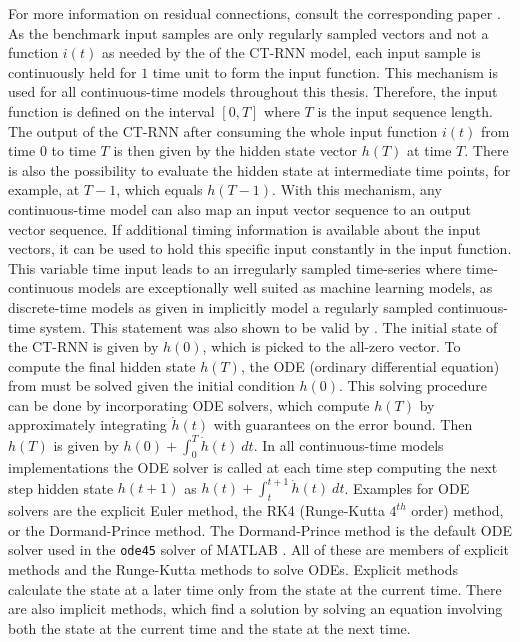 \documentclass[draft,final]{vutinfth} %
\begin{document}
    For more information on residual connections, consult the corresponding paper \cite{ResNet}.
    As the benchmark input samples are only regularly sampled vectors and not a function $i(t)$ as needed by the  of the CT-RNN model, each input sample is continuously held for $1$ time unit to form the input function.
    This mechanism is used for all continuous-time models throughout this thesis.
    Therefore, the input function is defined on the interval $[0, T]$ where $T$ is the input sequence length.
    The output of the CT-RNN after consuming the whole input function $i(t)$ from time $0$ to time $T$ is then given by the hidden state vector $h(T)$ at time $T$.
    There is also the possibility to evaluate the hidden state at intermediate time points, for example, at $T-1$, which equals $h(T-1)$.
    With this mechanism, any continuous-time model can also map an input vector sequence to an output vector sequence.
    If additional timing information is available about the input vectors, it can be used to hold this specific input constantly in the input function.
    This variable time input leads to an irregularly sampled time-series where time-continuous models are exceptionally well suited as machine learning models, as discrete-time models as given in  implicitly model a regularly sampled continuous-time system.
    This statement was also shown to be valid by \cite{ODELSTM}.
    The initial state of the CT-RNN is given by $h(0)$, which is picked to the all-zero vector.
    To compute the final hidden state $h(T)$, the ODE (ordinary differential equation) from  must be solved given the initial condition $h(0)$.
    This solving procedure can be done by incorporating ODE solvers, which compute $h(T)$ by approximately integrating $\dot h(t)$ with guarantees on the error bound.
    Then $h(T)$ is given by $h(0) + \int_0^T{\dot h(t)}~dt$.
    In all continuous-time models implementations the ODE solver is called at each time step computing the next step hidden state $h(t+1)$ as $h(t) + \int_t^{t+1}{\dot h(t)}~dt$.
    Examples for ODE solvers are the explicit Euler method, the RK4 (Runge-Kutta $4^{th}$ order) method, or the Dormand-Prince method.
    The Dormand-Prince method is the default ODE solver used in the \texttt{ode45} solver of MATLAB \cite{MATLAB}.
    All of these are members of explicit methods and the Runge-Kutta methods to solve ODEs. Explicit methods calculate the state at a later time only from the state at the current time.
    There are also implicit methods, which find a solution by solving an equation involving both the state at the current time and the state at the next time.
\end{document}
